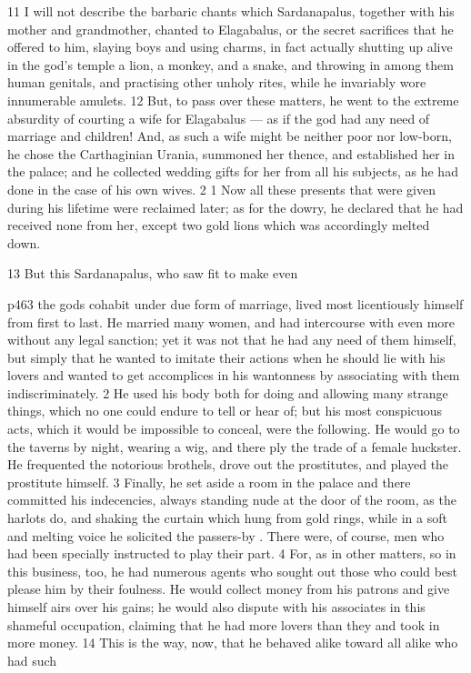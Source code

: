 11
I will not describe the barbaric chants which Sardanapalus, together with his mother and grandmother, chanted to Elagabalus, or the secret sacrifices that he offered to him, slaying boys and using charms, in fact actually shutting up alive in the god's temple a lion, a monkey, and a snake, and throwing in among them human genitals, and practising other unholy rites, while he invariably wore innumerable amulets. 12 But, to pass over these matters, he went to the extreme absurdity of courting a wife for Elagabalus \texthebrew{—} as if the god had any need of marriage and children! And, as such a wife might be neither poor nor low-born, he chose the Carthaginian Urania, summoned her thence, and established her in the palace; and he collected wedding gifts for her from all his subjects, as he had done in the case of his own wives. 2 1 Now all these presents that were given during his lifetime were reclaimed later; as for the dowry, he declared that he had received none from her, except two gold lions which was accordingly melted down.

13
But this Sardanapalus, who saw fit to make even

p463 the gods cohabit under due form of marriage, lived most licentiously himself from first to last. He married many women, and had intercourse with even more without any legal sanction; yet it was not that he had any need of them himself, but simply that he wanted to imitate their actions when he should lie with his lovers and wanted to get accomplices in his wantonness by associating with them indiscriminately. 2 He used his body both for doing and allowing many strange things, which no one could endure to tell or hear of; but his most conspicuous acts, which it would be impossible to conceal, were the following. He would go to the taverns by night, wearing a wig, and there ply the trade of a female huckster. He frequented the notorious brothels, drove out the prostitutes, and played the prostitute himself. 3 Finally, he set aside a room in the palace and there committed his indecencies, always standing nude at the door of the room, as the harlots do, and shaking the curtain which hung from gold rings, while in a soft and melting voice he solicited the passers-by . There were, of course, men who had been specially instructed to play their part. 4 For, as in other matters, so in this business, too, he had numerous agents who sought out those who could best please him by their foulness. He would collect money from his patrons and give himself airs over his gains; he would also dispute with his associates in this shameful occupation, claiming that he had more lovers than they and took in more money. 14 This is the way, now, that he behaved alike toward all alike who had such

